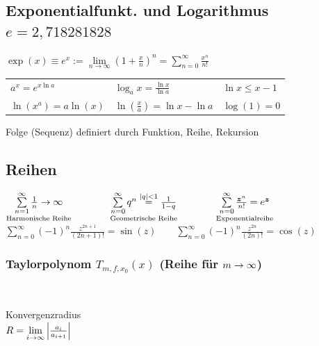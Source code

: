 \documentclass[german]{latex4ei/latex4ei_sheet}
\begin{document}
\begin{sectionbox}
	\subsection{Exponentialfunkt. und Logarithmus\ \ $e = 2,718281828$}
	$\exp(x) \equiv e^x := \lim\limits_{n \rightarrow \infty} \left( 1 + \frac{x}{n} \right)^n = \sum\limits_{n = 0}^{\infty} \frac{x^n}{n!}$\\
	\begin{tabular*}{\columnwidth}{l@{\extracolsep\fill}ll}
		$a^x = e^{x \ln a}$ & $\log_a x = \frac{\ln x}{\ln a}$ & $\ln x \le x -1$\\
		$\ln(x^{a}) = a \ln(x)$ & $\ln(\frac{x}{a}) = \ln x - \ln a$ & $\log(1) = 0$\\
	\end{tabular*}
\end{sectionbox}




\begin{sectionbox}
	Folge (Sequenz) definiert durch Funktion, Reihe, Rekursion\\

	\subsection{Reihen}
	$\underset{\text{Harmonische Reihe}}{\sum\limits_{n=1}^\infty \frac{1}{n} \rightarrow \infty} \qquad\qquad   \underset{\text{Geometrische Reihe}}{\sum\limits_{n=0}^\infty q^n \stackrel{|q|<1}= \frac{1}{1-q}}  \qquad\qquad \underset{\text{Exponentialreihe}}{\sum\limits_{n = 0}^{\infty} \frac{\boldsymbol{z}^n}{n!} = e^{\boldsymbol{z}}}$\\[0.5em]
	$\sum\limits_{n = 0}^{\infty} (-1)^n \frac{z^{2n +1}}{(2n +1)!} = \sin(z) \qquad \sum\limits_{n = 0}^{\infty} (-1)^n \frac{z^{2n}}{(2n)!} = \cos(z)$\\

	\subsubsection{Taylorpolynom $T_{m,f,x_0}(x)$ (Reihe für $m \rightarrow \infty$)}
	 \ \parbox{3.0cm}{ Konvergenzradius \\ $R=\underset{i\rightarrow \infty}{\lim} \left\vert\frac{a_i}{a_{i+1}}\right\vert$ }\\
\end{sectionbox}


\end{document}
